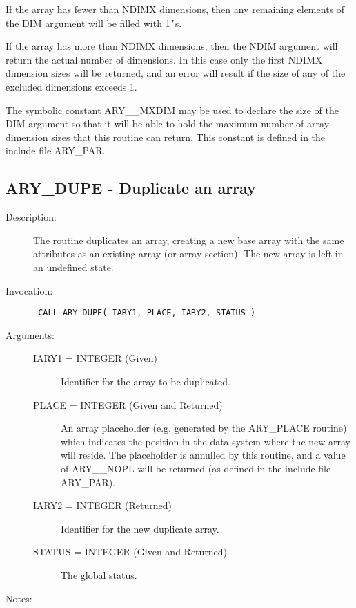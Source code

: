 \documentclass[twoside,11pt]{article}
\newcommand{\xlabel}[1]{}
\newlength{\sstbannerlength}
\newlength{\sstcaptionlength}
\newlength{\sstexampleslength}
\newlength{\sstexampleswidth}
\newcommand{\sstroutine}[3]{
   \goodbreak
   \rule{\textwidth}{0.5mm}
   \vspace{-7ex}
   \newline
   \settowidth{\sstbannerlength}{{\Large {\bf #1}}}
   \setlength{\sstcaptionlength}{\textwidth}
   \setlength{\sstexampleslength}{\textwidth}
   \addtolength{\sstbannerlength}{0.5em}
   \addtolength{\sstcaptionlength}{-2.0\sstbannerlength}
   \addtolength{\sstcaptionlength}{-5.0pt}
   \settowidth{\sstexampleswidth}{{\bf Examples:}}
   \addtolength{\sstexampleslength}{-\sstexampleswidth}
   \parbox[t]{\sstbannerlength}{\flushleft{\Large {\bf #1}}}
   \parbox[t]{\sstcaptionlength}{\center{\Large #2}}
   \parbox[t]{\sstbannerlength}{\flushright{\Large {\bf #1}}}
   \begin{description}
      #3
   \end{description}
}
\newcommand{\sstdescription}[1]{\item[Description:] #1}
\newcommand{\sstinvocation}[1]{\item[Invocation:]\hspace{0.4em}{\tt #1}}
\newcommand{\sstarguments}[1]{
   \item[Arguments:] \mbox{} \\
   \vspace{-3.5ex}
   \begin{description}
      #1
   \end{description}
}
\newcommand{\sstsubsection}[1]{ \item[{#1}] \mbox{} \\}
\newcommand{\sstnotes}[1]{\item[Notes:] \mbox{} \\[1.3ex] #1}
\newcommand{\sstitemlist}[1]{
  \mbox{} \\
  \vspace{-3.5ex}
  \begin{itemize}
     #1
  \end{itemize}
}
\newcommand{\sstitem}{\item}
\newcommand{\ssttt}{\tt}
\renewcommand{\sstroutine}[3]{
      \subsection{#1\xlabel{#1}-\label{#1}#2}
      \begin{description}
         #3
      \end{description}
   }
\renewcommand{\sstdescription}[1]{\item[Description:]
      \begin{description}
         #1
      \end{description}
   }
\renewcommand{\sstinvocation}[1]{\item[Invocation:]
      \begin{description}
         {\ssttt #1}
      \end{description}
   }
\renewcommand{\sstarguments}[1]{
      \item[Arguments:]
      \begin{description}
         #1
      \end{description}
   }
\renewcommand{\sstsubsection}[1]{\item[{#1}]}
\renewcommand{\sstnotes}[1]{\item[Notes:]
      \begin{description}
         #1
      \end{description}
   }
\newcommand{\sstitemlist}[1]{
      \begin{itemize}
         #1
      \end{itemize}
   }
\begin{document}
\begin{eqn*}
{{{         \sstitem
         If the array has fewer than NDIMX dimensions, then any
         remaining elements of the DIM argument will be filled with 1{\tt '}s.

         \sstitem
         If the array has more than NDIMX dimensions, then the NDIM
         argument will return the actual number of dimensions. In this
         case only the first NDIMX dimension sizes will be returned, and
         an error will result if the size of any of the excluded
         dimensions exceeds 1.

         \sstitem
         The symbolic constant ARY\_\_MXDIM may be used to declare the
         size of the DIM argument so that it will be able to hold the
         maximum number of array dimension sizes that this routine can
         return. This constant is defined in the include file ARY\_PAR.
      }
   }
}
\sstroutine{
   ARY\_DUPE
}{
   Duplicate an array
}{
   \sstdescription{
      The routine duplicates an array, creating a new base array with
      the same attributes as an existing array (or array section). The
      new array is left in an undefined state.
   }
   \sstinvocation{
      CALL ARY\_DUPE( IARY1, PLACE, IARY2, STATUS )
   }
   \sstarguments{
      \sstsubsection{
         IARY1 = INTEGER (Given)
      }{
         Identifier for the array to be duplicated.
      }
      \sstsubsection{
         PLACE = INTEGER (Given and Returned)
      }{
         An array placeholder (e.g. generated by the ARY\_PLACE routine)
         which indicates the position in the data system where the new
         array will reside. The placeholder is annulled by this
         routine, and a value of ARY\_\_NOPL will be returned (as defined
         in the include file ARY\_PAR).
      }
      \sstsubsection{
         IARY2 = INTEGER (Returned)
      }{
         Identifier for the new duplicate array.
      }
      \sstsubsection{
         STATUS = INTEGER (Given and Returned)
      }{
         The global status.
      }
   }
   \sstnotes{
      \sstitemlist{

}}}
\end{eqn*}
\end{document}
